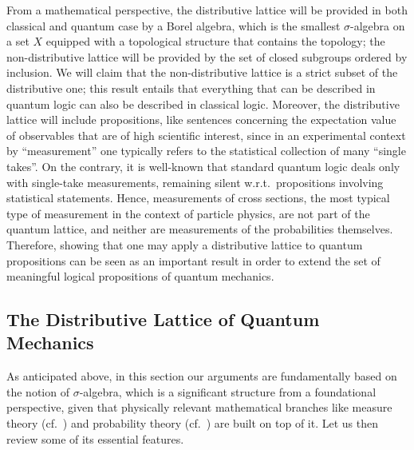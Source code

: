 \documentclass[11pt, executivepaper]{article}
\begin{document}
From a mathematical perspective, the distributive lattice will be provided in both classical and quantum case by a Borel algebra, which is the smallest $\sigma$-algebra on a set $X$ equipped with a topological structure that contains the topology; the non-distributive lattice will be provided by the set of closed subgroups ordered by inclusion. We will claim that the non-distributive lattice is a strict subset of the distributive one; this result entails that everything that can be described in quantum logic can also be described in classical logic. Moreover, the distributive lattice will include propositions, like sentences concerning the expectation value of observables that are of high scientific interest, since in an experimental context by ``measurement'' one typically refers to the statistical collection of many ``single takes''. On the contrary, it is well-known that standard quantum logic deals only with single-take measurements, remaining silent w.r.t.\ propositions involving statistical statements. Hence, measurements of cross sections, the most typical type of measurement in the context of particle physics, are not part of the quantum lattice, and neither are measurements of the probabilities themselves. Therefore, showing that one may apply a distributive lattice to quantum propositions can be seen as an important result in order to extend the set of meaningful logical propositions of quantum mechanics.  

\subsection{The Distributive Lattice of Quantum Mechanics}

As anticipated above, in this section our arguments are fundamentally based on the notion of $\sigma$-algebra, which is a significant structure from a foundational perspective, given that physically relevant mathematical branches like measure theory (cf.\ \cite{Cohn:2013}) and probability theory (cf.\ \cite{Grimmett:2001}) are built on top of it. Let us then review some of its essential features.
\end{document}
